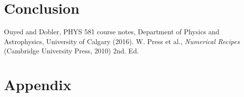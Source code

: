 \documentclass[twocolumn]{article}
\begin{document}
\section{Conclusion}

\begin{thebibliography}{00}
	Ouyed and Dobler, PHYS 581 course notes, Department of Physics and Astrophysics, University of Calgary (2016).
	W. Press et al., \emph{Numerical Recipes} (Cambridge University Press, 2010) 2nd. Ed.
\end{thebibliography}

\section{Appendix}

	
\end{document}
